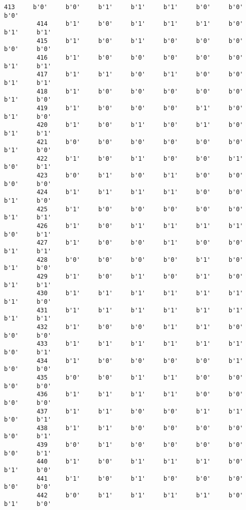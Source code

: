 \documentclass[11pt]{article}
\begin{document}
\begin{Verbatim}[commandchars=\\\{\}]
         413     b'0'     b'0'     b'1'     b'1'     b'1'     b'0'     b'0'     b'0'   
         414     b'1'     b'0'     b'1'     b'1'     b'1'     b'0'     b'1'     b'1'   
         415     b'1'     b'0'     b'1'     b'0'     b'0'     b'0'     b'0'     b'0'   
         416     b'1'     b'0'     b'0'     b'0'     b'0'     b'0'     b'1'     b'1'   
         417     b'1'     b'1'     b'0'     b'1'     b'0'     b'0'     b'1'     b'1'   
         418     b'1'     b'0'     b'0'     b'0'     b'0'     b'0'     b'1'     b'0'   
         419     b'1'     b'0'     b'0'     b'0'     b'1'     b'0'     b'1'     b'0'   
         420     b'1'     b'0'     b'1'     b'0'     b'1'     b'0'     b'1'     b'1'   
         421     b'0'     b'0'     b'0'     b'0'     b'0'     b'0'     b'1'     b'0'   
         422     b'1'     b'0'     b'1'     b'0'     b'0'     b'1'     b'0'     b'1'   
         423     b'0'     b'1'     b'0'     b'1'     b'0'     b'0'     b'0'     b'0'   
         424     b'1'     b'1'     b'1'     b'1'     b'0'     b'0'     b'1'     b'0'   
         425     b'1'     b'0'     b'0'     b'0'     b'0'     b'0'     b'1'     b'1'   
         426     b'1'     b'0'     b'1'     b'1'     b'1'     b'1'     b'0'     b'1'   
         427     b'1'     b'0'     b'0'     b'1'     b'0'     b'0'     b'1'     b'1'   
         428     b'0'     b'0'     b'0'     b'0'     b'1'     b'0'     b'1'     b'0'   
         429     b'1'     b'0'     b'1'     b'0'     b'1'     b'0'     b'1'     b'1'   
         430     b'1'     b'1'     b'1'     b'1'     b'1'     b'1'     b'1'     b'0'   
         431     b'1'     b'1'     b'1'     b'1'     b'1'     b'1'     b'1'     b'1'   
         432     b'1'     b'0'     b'0'     b'1'     b'1'     b'0'     b'0'     b'0'   
         433     b'1'     b'1'     b'1'     b'1'     b'1'     b'1'     b'0'     b'1'   
         434     b'1'     b'0'     b'0'     b'0'     b'0'     b'1'     b'0'     b'0'   
         435     b'0'     b'0'     b'1'     b'1'     b'0'     b'0'     b'0'     b'0'   
         436     b'1'     b'1'     b'1'     b'1'     b'0'     b'0'     b'0'     b'0'   
         437     b'1'     b'1'     b'0'     b'0'     b'1'     b'1'     b'0'     b'1'   
         438     b'1'     b'1'     b'0'     b'0'     b'0'     b'0'     b'0'     b'1'   
         439     b'0'     b'1'     b'0'     b'0'     b'0'     b'0'     b'0'     b'1'   
         440     b'1'     b'0'     b'1'     b'1'     b'1'     b'0'     b'1'     b'0'   
         441     b'1'     b'0'     b'1'     b'0'     b'0'     b'0'     b'0'     b'0'   
         442     b'0'     b'1'     b'1'     b'1'     b'1'     b'0'     b'1'     b'0'   

\end{Verbatim}
\end{document}
